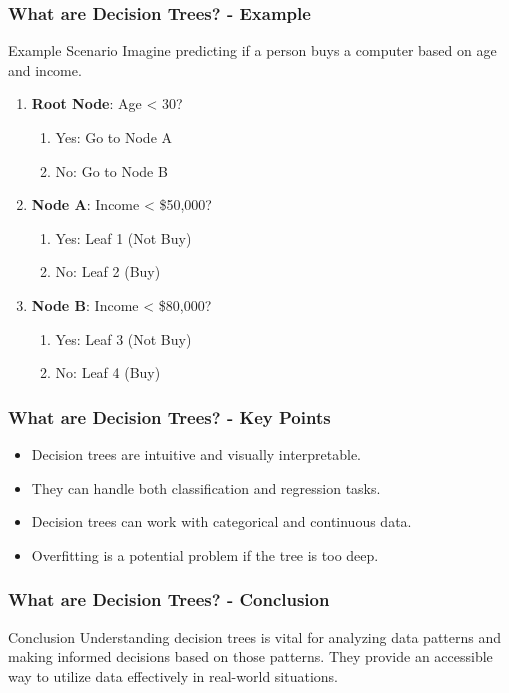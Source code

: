 \documentclass[aspectratio=169]{beamer}
\begin{document}
\begin{frame}[fragile]
    \frametitle{What are Decision Trees? - Example}
    \begin{block}{Example Scenario}
        Imagine predicting if a person buys a computer based on age and income. 
        \begin{enumerate}
            \item \textbf{Root Node}: Age < 30?
            \begin{enumerate}
                \item Yes: Go to Node A
                \item No: Go to Node B
            \end{enumerate}
            \item \textbf{Node A}: Income < \$50,000?
            \begin{enumerate}
                \item Yes: Leaf 1 (Not Buy)
                \item No: Leaf 2 (Buy)
            \end{enumerate}
            \item \textbf{Node B}: Income < \$80,000?
            \begin{enumerate}
                \item Yes: Leaf 3 (Not Buy)
                \item No: Leaf 4 (Buy)
            \end{enumerate}
        \end{enumerate}
    \end{block}
\end{frame}

\begin{frame}[fragile]
    \frametitle{What are Decision Trees? - Key Points}
    \begin{itemize}
        \item Decision trees are intuitive and visually interpretable.
        \item They can handle both classification and regression tasks.
        \item Decision trees can work with categorical and continuous data.
        \item Overfitting is a potential problem if the tree is too deep.
    \end{itemize}
\end{frame}

\begin{frame}[fragile]
    \frametitle{What are Decision Trees? - Conclusion}
    \begin{block}{Conclusion}
        Understanding decision trees is vital for analyzing data patterns and making informed decisions based on those patterns. 
        They provide an accessible way to utilize data effectively in real-world situations.
    \end{block}
\end{frame}
\end{document}
